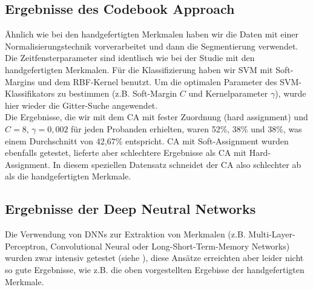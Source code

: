 \subsection{Ergebnisse des Codebook Approach} \label{ergebnisse-codebook-approach-subsec}


{\"A}hnlich wie bei den handgefertigten Merkmalen haben wir die Daten mit einer Normalisierungstechnik vorverarbeitet und dann die Segmentierung verwendet. Die Zeitfensterparameter sind identlisch wie bei der Studie mit den handgefertigten Merkmalen.
F{\"u}r die Klassifizierung haben wir SVM mit Soft-Margins und dem RBF-Kernel benutzt. 
Um die optimalen Parameter des SVM-Klassifikators zu bestimmen (z.B. Soft-Margin $C$ und Kernelparameter $\gamma$), wurde hier wieder die Gitter-Suche angewendet. \\


Die Ergebnisse, die wir mit dem CA mit fester Zuordnung (hard assignment) und $C = 8$, $\gamma = 0,002$ f{\"u}r jeden Probanden erhielten, waren 52\%, 38\% und 38\%, was einem Durchschnitt von 42,67\% entspricht. CA mit Soft-Assignment wurden ebenfalls getestet, lieferte aber schlechtere Ergebnisse als CA mit Hard-Assignment. In diesem speziellen Datensatz schneidet der CA also schlechter ab als die handgefertigten Merkmale.








\subsection{Ergebnisse der Deep Neutral Networks} \label{ergebnisse-dnn}

Die Verwendung von DNNs zur Extraktion von Merkmalen (z.B. Multi-Layer-Perceptron, Convolutional Neural oder Long-Short-Term-Memory Networks) wurden zwar intensiv getestet (siehe \cite{bscschnieber18}), diese Ansätze erreichten aber leider nicht so gute Ergebnisse, wie z.B. die oben vorgestellten Ergebisse der handgefertigten Merkmale. \\

